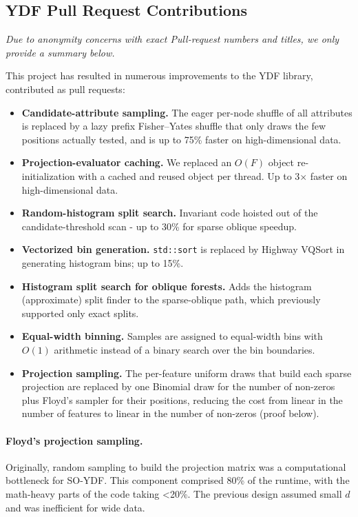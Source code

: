 \documentclass[sigconf]{acmart}%
\begin{document}
\subsection{YDF Pull Request Contributions}
\label{app:pull-requests}

\textit{Due to anonymity concerns with exact Pull-request numbers and titles, we only provide a summary below.}

This project has resulted in numerous improvements to the YDF library, contributed as pull requests:

\begin{itemize}
    \item \textbf{Candidate-attribute sampling.} The eager per-node shuffle of all attributes is replaced by a lazy prefix Fisher--Yates shuffle that only draws the few positions actually tested, and is up to 75\% faster on high-dimensional data.
    \item \textbf{Projection-evaluator caching.} We replaced an $O(F)$ object re-initialization with a cached and reused object per thread. Up to 3$\times$ faster on high-dimensional data.
    \item \textbf{Random-histogram split search.} Invariant code hoisted out of the candidate-threshold scan - up to 30\% for sparse oblique speedup.
    \item \textbf{Vectorized bin generation.} \texttt{std::sort} is replaced by Highway VQSort in generating histogram bins; up to 15\%.
    \item \textbf{Histogram split search for oblique forests.} Adds the histogram (approximate) split finder to the sparse-oblique path, which previously supported only exact splits.
    \item \textbf{Equal-width binning.} Samples are assigned to equal-width bins with $O(1)$ arithmetic instead of a binary search over the bin boundaries.
    \item \textbf{Projection sampling.} The per-feature uniform draws that build each sparse projection are replaced by one Binomial draw for the number of non-zeros plus Floyd's sampler for their positions, reducing the cost from linear in the number of features to linear in the number of non-zeros (proof below).
\end{itemize}

\paragraph{Floyd's projection sampling.}
Originally, random sampling to build the projection matrix was a computational bottleneck for SO-YDF. This component comprised 80\% of the runtime, with the math-heavy parts of the code taking <20\%. The previous design assumed small $d$ and was inefficient for wide data.
\end{document}
